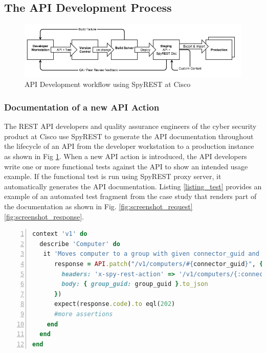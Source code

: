 \documentclass[10pt, conference]{IEEEtran}
\begin{document}
\subsection{The API Development Process} %
\begin{figure}[t]
\begin{center}
\includegraphics[width=18cm,keepaspectratio]{spyrestflow.png}
\end{center}
\caption{API Development workflow using SpyREST at Cisco}
\label{fig:spyrest_workflow}
\end{figure}


\subsubsection{Documentation of a new API Action}

The REST API developers and quality assurance engineers of the cyber security product at Cisco use SpyREST to generate the API documentation throughout the lifecycle of an API from the developer workstation to a production instance as shown in Fig \ref{fig:spyrest_workflow}. When a new API action is introduced, the API developers write one or more functional tests against the API to show an intended usage example. If the functional test is run using SpyREST proxy server, it automatically generates the API documentation. Listing \ref{listing_test} provides an example of an automated test fragment from the case study that renders part of the documentation as shown in Fig. \ref{fig:screenshot_request} \ref{fig:screenshot_response}.

\lstset{basicstyle=\footnotesize}
\begin{lstlisting}[language=Ruby,breaklines=true,showspaces=false,showstringspaces=false,numbers=left,xleftmargin=2em,caption={Functional Test Code},label=listing_test]
context 'v1' do
  describe 'Computer' do
   it 'Moves computer to a group with given connector_guid and group_guid' do
      response = API.patch("/v1/computers/#{connector_guid}", {
        headers: 'x-spy-rest-action' => '/v1/computers/{:connector_guid}',
        body: { group_guid: group_guid }.to_json
      })
      expect(response.code).to eql(202)
      #more assertions
    end
  end
end
\end{lstlisting}
\end{document}
